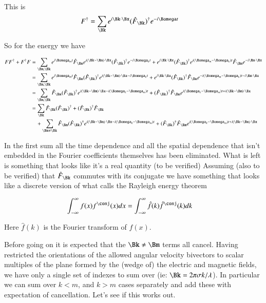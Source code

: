 This is
\begin{align}\label{eqn:planewave:conjugateField}
F^\dagger 
&= \sum_{\Bk} 
e^{i \Bk \cdot \Bx}
(\hat{F}_{\Bk})^{\dagger}
e^{-i \Bomega t}
\end{align}

So for the energy we have

\begin{align*}
FF^\dagger + F^\dagger F
&= 
\sum_{\Bm, \Bk} 
e^{i \Bomega_m t}
\hat{F}_{\Bm}
e^{i (\Bk-\Bm) \cdot \Bx}
(\hat{F}_{\Bk})^{\dagger}
e^{-i \Bomega_k t}
+
e^{i \Bk \cdot \Bx}
(\hat{F}_{\Bk})^{\dagger}
e^{i (\Bomega_m-\Bomega_k) t}
\hat{F}_{\Bm}
e^{-i \Bm \cdot \Bx} 
\\
&= 
\sum_{\Bm, \Bk} 
e^{i \Bomega_m t}
\hat{F}_{\Bm}
(\hat{F}_{\Bk})^{\dagger}
e^{i (\Bk-\Bm) \cdot \Bx -i \Bomega_k t}
+
e^{i \Bk \cdot \Bx}
(\hat{F}_{\Bk})^{\dagger}
\hat{F}_{\Bm}
e^{-i (\Bomega_m-\Bomega_k) t -i \Bm \cdot \Bx}
\\
&= 
\sum_{\Bm, \Bk} 
\hat{F}_{\Bm}
(\hat{F}_{\Bk})^{\dagger}
e^{i (\Bk-\Bm) \cdot \Bx -i (\Bomega_k-\Bomega_m) t}
+
(\hat{F}_{\Bk})^{\dagger}
\hat{F}_{\Bm}
e^{i (\Bomega_k-\Bomega_m) t +i (\Bk -\Bm) \cdot \Bx}
\\
&= 
\sum_{\Bk} 
\hat{F}_{\Bk}
(\hat{F}_{\Bk})^{\dagger}
+
(\hat{F}_{\Bk})^{\dagger}
\hat{F}_{\Bk} \\
&\quad+ 
\sum_{\Bm \ne \Bk} 
\hat{F}_{\Bm}
(\hat{F}_{\Bk})^{\dagger}
e^{i (\Bk-\Bm) \cdot \Bx -i (\Bomega_k-\Bomega_m) t}
+
(\hat{F}_{\Bk})^{\dagger}
\hat{F}_{\Bm}
e^{i (\Bomega_k-\Bomega_m) t +i (\Bk -\Bm) \cdot \Bx}
\\
\end{align*}

In the first sum all the time dependence and all the spatial dependence 
that isn't embedded in the Fourier coefficients themselves has been eliminated.
What is left is something that looks like it's a real quantity (to be verified)
Assuming (also to be verified) that $\hat{F}_{\Bk}$ commutes with its conjugate
we have something that looks 
like a discrete version of what \cite{haykin1994cs} calls
the Rayleigh energy theorem

\begin{align*}
\IIinf f(x)f^\conj(x) dx &= \IIinf \hat{f}(k)\hat{f}^\conj(k) dk
\end{align*}

Here $\hat{f}(k)$ is the Fourier transform of $f(x)$.

Before going on it is expected that
the $\Bk \ne \Bm$ terms all cancel.
Having restricted the orientations of the allowed angular velocity bivectors to scalar multiples of the plane formed by the (wedge of) the electric
and magnetic fields, we have only a single set of indexes to sum over (ie: $\Bk = 2 \pi \sigma k/ \lambda$).
In particular we can sum over $k < m$, and $k > m$ cases separately and add these
with expectation of cancellation.  Let's see if this works out.

